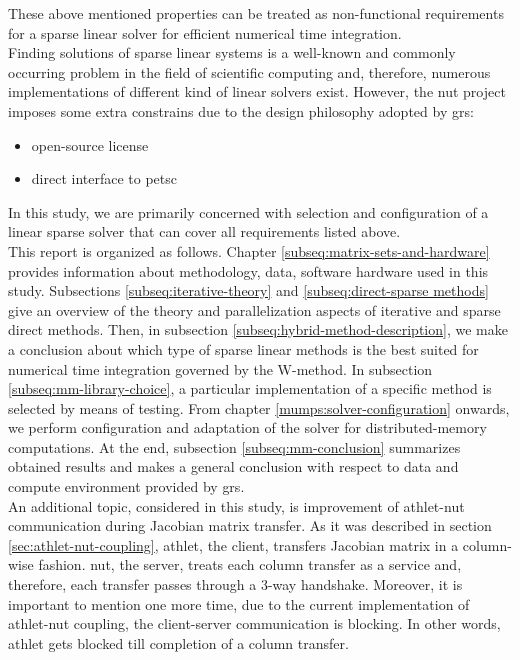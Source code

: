 These above mentioned properties can be treated as non-functional requirements for a sparse linear solver for efficient numerical time integration.\\

 
Finding solutions of sparse linear systems is a well-known and commonly occurring problem in the field of scientific computing and, therefore, numerous implementations of different kind of linear solvers exist. However, the \acrshort{nut} project imposes some extra constrains due to the design philosophy adopted by \acrshort{grs}: \\


\begin{itemize}
	\item open-source license
	\item direct interface to \acrshort{petsc}
\end{itemize}



In this study, we are primarily concerned with selection and configuration of a linear sparse solver that can cover all requirements listed above.\\


This report is organized as follows. Chapter \ref{subseq:matrix-sets-and-hardware} provides information about methodology, data, software hardware used in this study. Subsections \ref{subseq:iterative-theory} and \ref{subseq:direct-sparse methods} give an overview of the theory and parallelization aspects of iterative and sparse direct methods. Then, in subsection \ref{subseq:hybrid-method-description}, we make a conclusion about which type of sparse linear methods is the best suited for numerical time integration governed by the W-method. In subsection 
\ref{subseq:mm-library-choice}, a particular implementation of a specific method is selected by means of testing. From chapter \ref{mumps:solver-configuration} onwards, we perform configuration and adaptation of the solver for distributed-memory computations. At the end, subsection \ref{subseq:mm-conclusion} summarizes obtained results and makes a general conclusion with respect to data and compute environment provided by  \acrshort{grs}.\\




An additional topic, considered in this study, is improvement of \acrshort{athlet}-\acrshort{nut} communication during Jacobian matrix transfer. As it was described in section \ref{sec:athlet-nut-coupling}, \acrshort{athlet}, the client, transfers Jacobian matrix in a column-wise fashion. \acrshort{nut}, the server, treats each column transfer as a service and, therefore, each transfer passes through a 3-way handshake. Moreover, it is important to mention one more time,   due to the current implementation of \acrshort{athlet}-\acrshort{nut} coupling, the client-server communication is blocking. In other words, \acrshort{athlet} gets blocked till completion of a column transfer. \\


